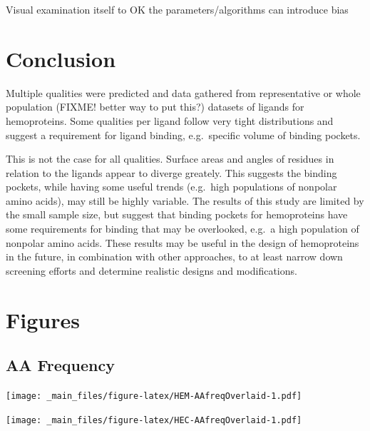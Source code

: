 \documentclass[a4paper, nobind]{templates/ociamthesis}
\let\origfigure\figure
\let\endorigfigure\endfigure
\renewenvironment{figure}[1][2] {
    \expandafter\origfigure\expandafter[H]
} {
    \endorigfigure
}
\begin{document}
Visual examination itself to OK the parameters/algorithms can introduce bias

\adjustmtc
{}

\hypertarget{conclusion}{%
\chapter{Conclusion}\label{conclusion}}

Multiple qualities were predicted and data gathered from representative or whole population (FIXME! better way to put this?) datasets of ligands for hemoproteins. Some qualities per ligand follow very tight distributions and suggest a requirement for ligand binding, e.g.~specific volume of binding pockets.

This is not the case for all qualities. Surface areas and angles of residues in relation to the ligands appear to diverge greately. This suggests the binding pockets, while having some useful trends (e.g.~high populations of nonpolar amino acids), may still be highly variable.
The results of this study are limited by the small sample size, but suggest that binding pockets for hemoproteins have some requirements for binding that may be overlooked, e.g.~a high population of nonpolar amino acids. These results may be useful in the design of hemoproteins in the future, in combination with other approaches, to at least narrow down screening efforts and determine realistic designs and modifications.

\startappendices

\hypertarget{a-figures}{%
\chapter{Figures}\label{a-figures}}

\hypertarget{figs-aaFreqOverlaid}{%
\section{AA Frequency}\label{figs-aaFreqOverlaid}}

\begin{figure}
\centering
\texttt{[image: \_main\_files/figure-latex/HEM-AAfreqOverlaid-1.pdf]}
\caption{\label{fig:HEM-AAfreqOverlaid}HEM: AA Frequency}
\end{figure}

\begin{figure}
\centering
\texttt{[image: \_main\_files/figure-latex/HEC-AAfreqOverlaid-1.pdf]}
\caption{\label{fig:HEC-AAfreqOverlaid}HEC: AA Frequency}
\end{figure}
\end{document}
